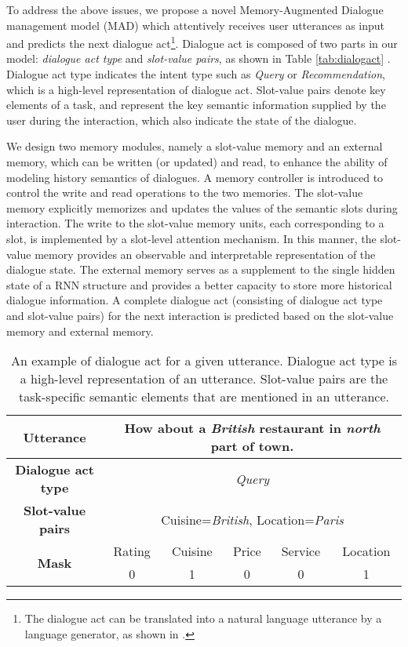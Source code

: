 To address the above issues, we propose a novel Memory-Augmented Dialogue management model (MAD) which attentively receives user utterances as input and predicts the next dialogue act\footnote{The dialogue act can be translated into a natural language utterance by a language generator, as shown in \cite{wen2015semantically}.
}. 
Dialogue act is composed of two parts in our model: {\it dialogue act type} and {\it slot-value pairs}, as shown in Table \ref{tab:dialogact} . 
Dialogue act type indicates the intent type such as {\it Query} or {\it Recommendation}, which is a high-level representation of dialogue act. Slot-value pairs denote key elements of a task, and represent the key semantic information supplied by the user during the interaction, which also indicate the state of the dialogue.


We design two memory modules, namely a slot-value memory and an external memory, which can be written (or updated) and read, to enhance the ability of modeling history semantics of dialogues. %
A memory controller is introduced to control the write and read operations to the two memories.
The slot-value memory explicitly memorizes and updates the values of the semantic slots during interaction. The write to the slot-value memory units, each corresponding to a slot, is implemented by a slot-level attention mechanism. In this manner, the slot-value memory provides an observable and interpretable representation of the dialogue state. The external memory serves as a supplement to the single hidden state of a RNN structure and provides a better capacity to store more historical dialogue information. A complete dialogue act (consisting of dialogue act type and slot-value pairs) for the next interaction is predicted based on the slot-value memory and external memory.



\begin{table}[htbp]
\small
\centering
\begin{tabular}{|c|c|c|c|c|c|}
  \hline
    {\bf Utterance} & \multicolumn{5}{c|}{How about a {\em British} restaurant in {\em north} part of town.}\\
  \hline
    {\bf Dialogue act type}&\multicolumn{5}{c|}{\em Query}\\
  \hline
    {\bf Slot-value pairs}&\multicolumn{5}{c|}{Cuisine={\em British}, Location={\em Paris}}\\
  \hline
    \multirow{2}{*}{\bf Mask} (auxiliary) & Rating & Cuisine & Price & Service & Location\\
  \cline{2-6}
    & 0 & 1 & 0 & 0 & 1\\
  \hline
\end{tabular}
\caption{\label{tab:dialogact}An example of dialogue act for a given utterance. Dialogue act type is a high-level representation of an utterance. Slot-value pairs are the task-specific semantic elements that are mentioned in an utterance.}
\label{appendix-da-example}
\end{table}


